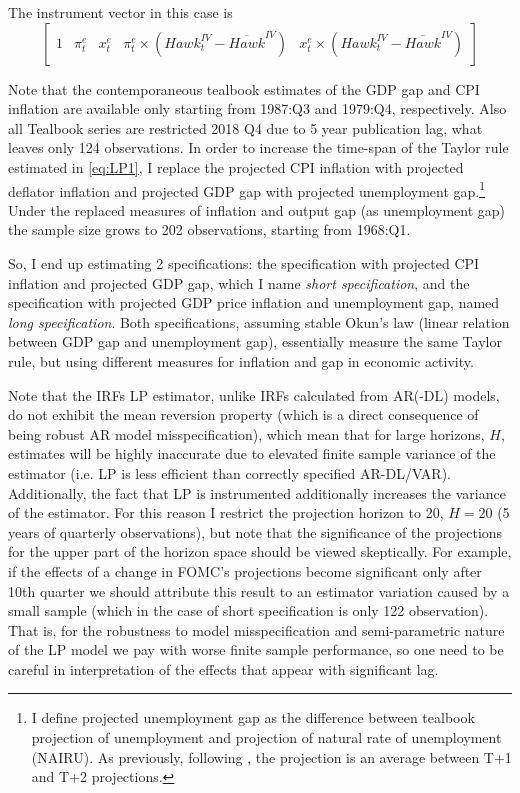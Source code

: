 \documentclass[11pt]{article}
\begin{document}
The instrument vector in this case is 
\[\begin{bmatrix}
  1& \pi_t^e& x_t^e& \pi_t^e\times\left(\mathit{Hawk}_{t}^\mathit{IV}-\overline{\mathit{Hawk}}^\mathit{IV}\right)& x_t^e\times\left(\mathit{Hawk}_{t}^\mathit{IV}-\overline{\mathit{Hawk}}^\mathit{IV}\right)
\end{bmatrix}\]

Note that the contemporaneous tealbook estimates of the GDP gap and CPI inflation are available only starting from 1987:Q3 and 1979:Q4, respectively. 
Also all Tealbook series are restricted 2018 Q4 due to 5 year publication lag, what leaves only 124 observations. 
In order to increase the time-span of the Taylor rule estimated in \vref{eq:LP1}, I replace the projected CPI inflation with projected deflator inflation and projected GDP gap with projected unemployment gap.\footnote{I define projected unemployment gap as the difference between tealbook projection of unemployment and projection of natural rate of unemployment (NAIRU). As previously, following \citet{CoibionGorodnichenko2011}, the projection is an average between T+1 and T+2 projections.} Under the replaced measures of inflation and output gap (as unemployment gap) the sample size grows to 202 observations, starting from 1968:Q1.

So, I end up estimating 2 specifications: the specification with projected CPI inflation and projected GDP gap, which I name \emph{short specification}, and the specification with projected GDP price inflation and unemployment gap, named \emph{long specification}. 
Both specifications, assuming stable Okun's law (linear relation between GDP gap and unemployment gap), essentially measure the same Taylor rule, but using different measures for inflation and gap in economic activity. 

Note that the IRFs LP estimator, unlike IRFs calculated from AR(-DL) models, do not exhibit the mean reversion property (which is a direct consequence of being robust AR model misspecification), which mean that for large horizons, $H$, estimates will be highly inaccurate due to elevated finite sample variance of the estimator (i.e. LP is less efficient than correctly specified AR-DL/VAR). 
Additionally, the fact that LP is instrumented additionally increases the variance of the estimator.
For this reason I restrict the projection horizon to 20, $H=20$ (5 years of quarterly observations), but note that the significance of the projections for the upper part of the horizon space should be viewed skeptically. 
For example, if the effects of a change in FOMC's projections become significant only after 10th quarter we should attribute this result to an estimator variation caused by a small sample (which in the case of short specification is only 122 observation).
That is, for the robustness to model misspecification and semi-parametric nature of the LP model we pay with worse finite sample performance, so one need to be careful in interpretation of the effects that appear with significant lag. 
\end{document}

